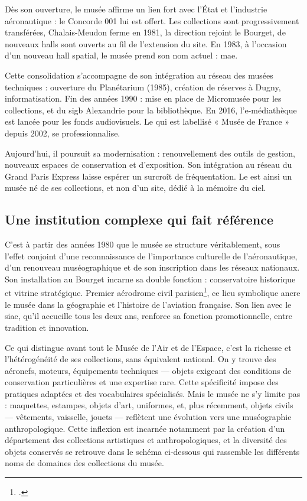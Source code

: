 Dès son ouverture, le musée affirme un lien fort avec l’État et l’industrie aéronautique : le Concorde 001 lui est offert. Les collections sont progressivement transférées, Chalais-Meudon ferme en 1981, la direction rejoint le Bourget, de nouveaux halls sont ouverts au fil de l’extension du site. En 1983, à l’occasion d’un nouveau hall spatial, le musée prend son nom actuel : \acf{mae}.

Cette consolidation s’accompagne de son intégration au réseau des musées techniques : ouverture du Planétarium (1985), création de réserves à Dugny, informatisation. Fin des années 1990 : mise en place de Micromusée pour les collections, et du \ac{sigb} Alexandrie pour la bibliothèque. En 2016, l’e-médiathèque est lancée pour les fonds audiovisuels. Le \mae qui est labellisé « Musée de France » depuis 2002, se professionnalise.

Aujourd’hui, il poursuit sa modernisation : renouvellement des outils de gestion, nouveaux espaces de conservation et d’exposition. Son intégration au réseau du Grand Paris Express laisse espérer un surcroît de fréquentation. Le \mae est ainsi un musée né de ses collections, et non d’un site, dédié à la mémoire du ciel.

\subsection{Une institution complexe qui fait référence}

C’est à partir des années 1980 que le musée se structure véritablement, sous l’effet conjoint d’une reconnaissance de l’importance culturelle de l’aéronautique, d’un renouveau muséographique et de son inscription dans les réseaux nationaux. Son installation au Bourget incarne sa double fonction : conservatoire historique et vitrine stratégique. Premier aérodrome civil parisien\footcite{terrierAeroportParisBourget2019}, ce lieu symbolique ancre le musée dans la géographie et l’histoire de l’aviation française. Son lien avec le \ac{siae}, qu’il accueille tous les deux ans, renforce sa fonction promotionnelle, entre tradition et innovation.

Ce qui distingue avant tout le Musée de l’Air et de l’Espace, c’est la richesse et l’hétérogénéité de ses collections, sans équivalent national. On y trouve des aéronefs, moteurs, équipements techniques — objets exigeant des conditions de conservation particulières et une expertise rare. Cette spécificité impose des pratiques adaptées et des vocabulaires spécialisés. Mais le musée ne s’y limite pas : maquettes, estampes, objets d’art, uniformes, et, plus récemment, objets civils — vêtements, vaisselle, jouets — reflètent une évolution vers une muséographie anthropologique. Cette inflexion est incarnée notamment par la création d'un département des collections artistiques et anthropologiques, et la diversité des objets conservés se retrouve dans le schéma ci-dessous qui rassemble les différents noms de domaines des collections du musée.

